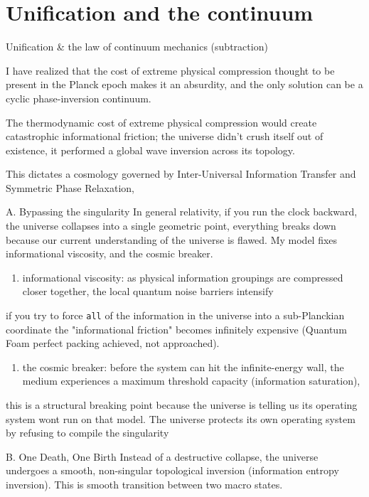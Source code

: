 \chapter{Unification and the continuum}

Unification \& the law of continuum mechanics (subtraction)

I have realized that the cost of extreme physical compression thought to be present in the Planck epoch makes it an absurdity, and the only solution can be a cyclic phase-inversion continuum.

The thermodynamic cost of extreme physical compression would create catastrophic informational friction; the universe didn't crush itself out of existence, it performed a global wave inversion across its topology.

This dictates a cosmology governed by Inter-Universal Information Transfer and Symmetric Phase Relaxation,

A. Bypassing the singularity In general relativity, if you run the clock backward, the universe collapses into a single geometric point, everything breaks down because our current understanding of the universe is flawed. My model fixes informational viscosity, and the cosmic breaker.

\begin{enumerate}
\item informational viscosity: as physical information groupings are compressed closer together, the local quantum noise barriers intensify
\end{enumerate}

if you try to force \texttt{all} of the information in the universe into a sub-Planckian coordinate the "informational friction" becomes infinitely expensive (Quantum Foam perfect packing achieved, not approached).

\begin{enumerate}
\item the cosmic breaker: before the system can hit the infinite-energy wall, the medium experiences a maximum threshold capacity (information saturation),
\end{enumerate}

this is a structural breaking point because the universe is telling us its operating system wont run on that model. The universe protects its own operating system by refusing to compile the singularity

B. One Death, One Birth Instead of a destructive collapse, the universe undergoes a smooth, non-singular topological inversion (information entropy inversion). This is smooth transition between two macro states.

